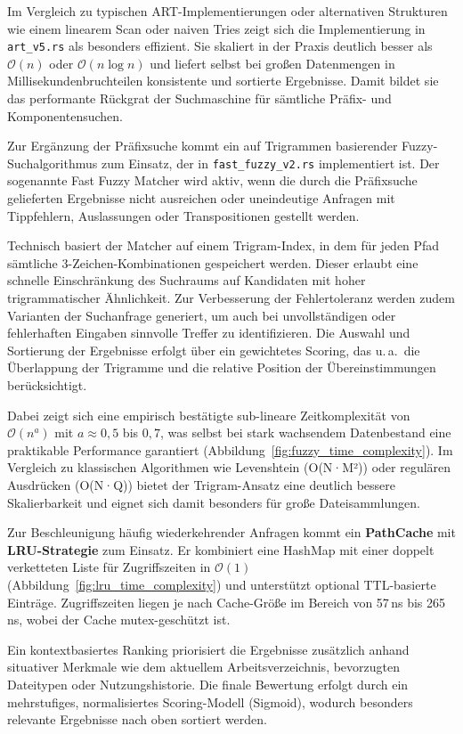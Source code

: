 Im Vergleich zu typischen ART-Implementierungen oder alternativen Strukturen wie einem linearem Scan oder naiven Tries
zeigt sich die Implementierung in \verb|art_v5.rs| als besonders effizient.
Sie skaliert in der Praxis deutlich besser als $\mathcal{O}(n)$ oder $\mathcal{O}(n \log n)$
und liefert selbst bei großen Datenmengen in Millisekundenbruchteilen konsistente und sortierte Ergebnisse.
Damit bildet sie das performante Rückgrat der Suchmaschine für sämtliche Präfix- und Komponentensuchen.

Zur Ergänzung der Präfixsuche kommt ein auf Trigrammen basierender Fuzzy-Suchalgorithmus zum Einsatz,
der in \verb|fast_fuzzy_v2.rs| implementiert ist.
Der sogenannte Fast Fuzzy Matcher wird aktiv, wenn die durch die Präfixsuche gelieferten Ergebnisse nicht ausreichen
oder uneindeutige Anfragen mit Tippfehlern, Auslassungen oder Transpositionen gestellt werden.

Technisch basiert der Matcher auf einem Trigram-Index, in dem für jeden Pfad sämtliche 3-Zeichen-Kombinationen gespeichert werden.
Dieser erlaubt eine schnelle Einschränkung des Suchraums auf Kandidaten mit hoher trigrammatischer Ähnlichkeit.
Zur Verbesserung der Fehlertoleranz werden zudem Varianten der Suchanfrage generiert, um auch bei unvollständigen oder fehlerhaften Eingaben sinnvolle Treffer zu identifizieren.
Die Auswahl und Sortierung der Ergebnisse erfolgt über ein gewichtetes Scoring, das u.\,a.\ die Überlappung der Trigramme und die relative Position der Übereinstimmungen berücksichtigt.

Dabei zeigt sich eine empirisch bestätigte sub-lineare Zeitkomplexität von $\mathcal{O}(n^a)$ mit $a \approx 0{,}5$ bis $0{,}7$,
was selbst bei stark wachsendem Datenbestand eine praktikable Performance garantiert (Abbildung~\ref{fig:fuzzy_time_complexity}).
Im Vergleich zu klassischen Algorithmen wie Levenshtein (O(N·M²)) oder regulären Ausdrücken (O(N·Q)) bietet der Trigram-Ansatz eine deutlich bessere Skalierbarkeit
und eignet sich damit besonders für große Dateisammlungen.

Zur Beschleunigung häufig wiederkehrender Anfragen kommt ein \textbf{PathCache} mit \textbf{LRU-Strategie} zum Einsatz.
Er kombiniert eine HashMap mit einer doppelt verketteten Liste für Zugriffszeiten in $\mathcal{O}(1)$ (Abbildung~\ref{fig:lru_time_complexity}) und unterstützt optional TTL-basierte Einträge.
Zugriffszeiten liegen je nach Cache-Größe im Bereich von 57\,ns bis 265\,ns, wobei der Cache mutex-geschützt ist. 

Ein kontextbasiertes Ranking priorisiert die Ergebnisse zusätzlich anhand situativer Merkmale wie dem aktuellem Arbeitsverzeichnis, bevorzugten Dateitypen oder Nutzungshistorie.
Die finale Bewertung erfolgt durch ein mehrstufiges, normalisiertes Scoring-Modell (Sigmoid), wodurch besonders relevante Ergebnisse nach oben sortiert werden.

